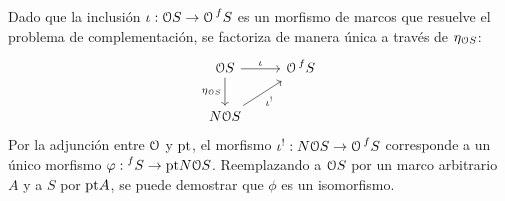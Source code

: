 Dado que la inclusión $\iota:\cal OS\to\cal O\prs f{}S$
es un morfismo de marcos que resuelve el problema de complementación,
se factoriza de manera única a través de $\eta_{\cal OS}$:
\[
    \begin{tikzcd}
        \cal OS \ar[d,"\eta_{\cal OS}"'] \ar[r,"\iota"]
        & \cal O\prs f{}S \\
        N\cal OS \ar[ur,"\iota^!"']
    \end{tikzcd}
\]
Por la adjunción entre $\cal O$ y $\pt$,
el morfismo $\iota^!:N\cal OS\to\cal O\prs f{}S$ corresponde
a un único morfismo $\phi:\prs f{}S\to\pt N\cal OS$.
Reemplazando a $\cal OS$ por un marco arbitrario $A$
y a $S$ por $\pt A$,
se puede demostrar que $\phi$ es un isomorfismo.